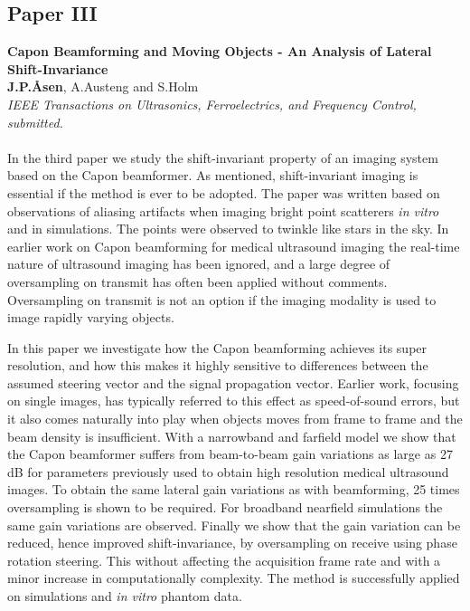 \subsection{Paper III}
\textbf{Capon Beamforming and Moving Objects - An Analysis of Lateral Shift-Invariance}\\
\textbf{J.\:P.\:\AA{}sen}, A.\:Austeng and S.\:Holm\\
{\it IEEE Transactions on Ultrasonics, Ferroelectrics, and Frequency Control, submitted.}\\\\
In the third paper we study the shift-invariant property of an imaging system based on the Capon beamformer. As mentioned, shift-invariant imaging is essential if the method is ever to be adopted. The paper was written based on observations of aliasing artifacts when imaging bright point scatterers \textit{in vitro} and in simulations. The points were observed to twinkle like stars in the sky. In earlier work on Capon beamforming for medical ultrasound imaging the real-time nature of ultrasound imaging has been ignored, and a large degree of oversampling on transmit has often been applied without comments. Oversampling on transmit is not an option if the imaging modality is used to image rapidly varying objects.

In this paper we investigate how the Capon beamforming achieves its super resolution, and how this makes it highly sensitive to differences between the assumed steering vector and the signal propagation vector. Earlier work, focusing on single images, has typically referred to this effect as speed-of-sound errors, but it also comes naturally into play when objects moves from frame to frame and the beam density is insufficient. With a narrowband and farfield model we show that the Capon beamformer suffers from beam-to-beam gain variations as large as 27 dB for parameters previously used to obtain high resolution medical ultrasound images.  To obtain the same lateral gain variations as with  beamforming, 25 times oversampling is shown to be required. For broadband nearfield simulations the same gain variations are observed. Finally we show that the gain variation can be reduced, hence improved shift-invariance, by oversampling on receive using phase rotation steering. This without affecting the acquisition frame rate and with a minor increase in computationally complexity. The method is successfully applied on simulations and \textit{in vitro} phantom data.


